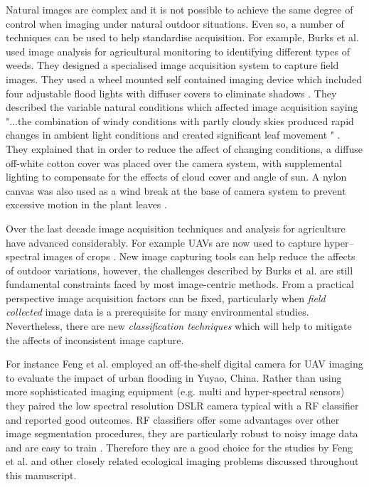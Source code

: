Natural images are complex and it is not possible to achieve the same degree of control when imaging under natural outdoor situations. Even so, a number of techniques can be used to help standardise acquisition. For example, Burks et al. \cite{Burks2000} used image analysis for agricultural monitoring to identifying different types of weeds. They designed a specialised image acquisition system to capture field images. They used a wheel mounted self contained imaging device which included four adjustable flood lights with diffuser covers to eliminate shadows \cite{Burks2000}. They described the variable natural conditions which affected image acquisition saying "...the combination of windy conditions with partly cloudy skies produced rapid changes in ambient light conditions and created significant leaf movement " \cite[pg.444]{Burks2000}. They explained that in order to reduce the affect of changing conditions, a diffuse off-white cotton cover was placed over the camera system, with supplemental lighting to compensate for the effects of cloud cover and angle of sun. A nylon canvas was also used as a wind break at the base of camera system to prevent excessive motion in the plant leaves \cite{Burks2000}. 

Over the last decade image acquisition techniques and analysis for agriculture have advanced considerably. For example \acp{UAV} are now used to capture hyper--spectral images of crops \cite{Jay2009,Pena2012,Pena2015,Pajares2015}. New image capturing tools can help reduce the affects of outdoor variations, however, the challenges described by Burks et al. \cite{Burks2000} are still fundamental constraints faced by most image-centric methods. From a practical perspective image acquisition factors can be fixed, particularly when \emph{field collected} image data is a prerequisite for many environmental studies. Nevertheless, there are new \emph{classification techniques} which will help to mitigate the affects of inconsistent image capture. 

For instance Feng et al.\cite{Feng2015a,Feng2015b} employed an off-the-shelf digital camera for \ac{UAV} imaging to evaluate the impact of urban flooding in Yuyao, China. Rather than using more sophisticated imaging equipment (e.g. multi and hyper-spectral sensors) they paired the low spectral resolution \ac{DSLR} camera typical with a \ac{RF} classifier and reported good outcomes. \ac{RF} classifiers offer some advantages over other image segmentation procedures, they are particularly robust to noisy image data and are easy to train \cite{Waske2007,Mellor2013}. Therefore they are a good choice for the studies by Feng et al.\cite{Feng2015a,Feng2015b} and other closely related ecological imaging problems discussed throughout this manuscript.

